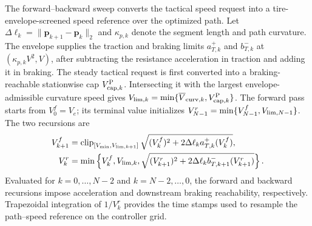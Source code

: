 \documentclass[journal,twoside,web]{ieeecolor}
\begin{document}
The forward--backward sweep converts the tactical speed request into a
tire-envelope-screened speed reference over the optimized path. Let
$\Delta\ell_k=\|\bm p_{k+1}-\bm p_k\|_2$ and $\kappa_{p,k}$ denote the segment
length and path curvature. The envelope supplies the traction and
braking limits \(a_{T,k}^{+}\) and \(b_{T,k}^{-}\) at
\((\kappa_{p,k}V^2,V)\), after subtracting the resistance acceleration in
traction and adding it in braking.
The steady tactical request is first converted into a braking-reachable
stationwise cap $V_{{\rm cap},k}^{\rm P}$. Intersecting it with the largest
envelope-admissible curvature speed gives
$V_{{\rm lim},k}=\min\{\overline V_{{\rm curv},k},
V_{{\rm cap},k}^{\rm P}\}$. The forward pass starts from $V_0^f=V_e$;
its terminal value initializes
$V_{N-1}^r=\min\{V_{N-1}^{f},V_{{\rm lim},N-1}\}$. The two recursions are
\begin{equation}
\begin{aligned}
V_{k+1}^{f}&=\operatorname{clip}_{[V_{\min},V_{{\rm lim},k+1}]}
\sqrt{(V_k^f)^2+2\Delta\ell_k a_{T,k}^{+}(V_k^f)},\\
V_k^r&=\min\left\{V_k^f,V_{{\rm lim},k},
\sqrt{(V_{k+1}^r)^2+
2\Delta\ell_k b_{T,k+1}^{-}(V_{k+1}^r)}\right\}.
\end{aligned}
\label{eq:execution_speed_sweep}
\end{equation}
Evaluated for $k=0,\ldots,N-2$ and $k=N-2,\ldots,0$, the forward and backward
recursions impose acceleration and downstream braking reachability,
respectively. Trapezoidal integration of $1/V_k^r$ provides the time stamps
used to resample the path--speed reference on the controller grid.
\end{document}
